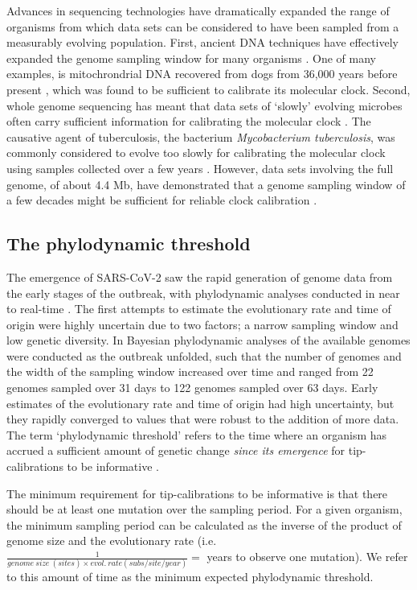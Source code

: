 \documentclass[11pt]{article}
\begin{document}
Advances in sequencing technologies have dramatically expanded the range of organisms from which data sets can be considered to have been sampled from a measurably evolving population. First, ancient DNA techniques have effectively expanded the genome sampling window for many organisms \citep{spyrou2019ancient, duchene2020recovery}. One of many examples, is mitochrondrial DNA recovered from dogs from 36,000 years before present \citep{thalmann2013complete}, which was found to be sufficient to calibrate its molecular clock. Second, whole genome sequencing has meant that data sets of `slowly' evolving microbes often carry sufficient information for calibrating the molecular clock \citep{biek2015measurably}. The causative agent of tuberculosis, the bacterium \textit{Mycobacterium tuberculosis}, was commonly considered to evolve too slowly for calibrating the molecular clock using samples collected over a few years \cite{duchene2016genome}. However, data sets involving the full genome, of about 4.4 Mb, have demonstrated that a genome sampling window of a few decades might be sufficient for reliable clock calibration \citep{menardo2019molecular}.

\subsection{The phylodynamic threshold}
The emergence of SARS-CoV-2 saw the rapid generation of genome data from the early stages of the outbreak, with phylodynamic analyses conducted in near to real-time \citep{attwood2022phylogenetic}. The first attempts to estimate the evolutionary rate and time of origin were highly uncertain due to two factors; a narrow sampling window and low genetic diversity. In \cite{duchene2020temporal} Bayesian phylodynamic analyses of the available genomes were conducted as the outbreak unfolded, such that the number of genomes and the width of the sampling window increased over time and ranged from 22 genomes sampled over 31 days to 122 genomes sampled over 63 days.  Early estimates of the evolutionary rate and time of origin had high uncertainty, but they rapidly converged to values that were robust to the addition of more data. The term `phylodynamic threshold' refers to the time where an organism has accrued a sufficient amount of genetic change \textit{since its emergence} for tip-calibrations to be informative \citep{duchene2020temporal}.

The minimum requirement for tip-calibrations to be informative is that there should be at least one mutation over the sampling period. For a given organism, the minimum sampling period can be calculated as the inverse of the product of genome size and the evolutionary rate (i.e. $\frac{1}{genome\ size\ (sites) \times evol.\ rate (subs/site/year)}=$ years to observe one mutation). We refer to this amount of time as the minimum expected phylodynamic threshold.
\end{document}
